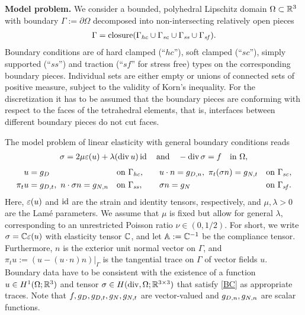\documentclass[11pt]{article}
\begin{document}
{\bf Model problem.}
We consider a bounded, polyhedral Lipschitz domain $\Omega\subset\mathbb{R}^3$
with boundary $\Gamma:=\partial\Omega$ decomposed into non-intersecting relatively open pieces
\begin{align*} %
   \Gamma=\mathrm{closure}(\G{hc}\cup\G{sc}\cup\G{ss}\cup\G{sf}).
\end{align*}
Boundary conditions are of hard clamped (``$\mathit{hc}$''), soft clamped (``$\mathit{sc}$''),
simply supported (``$\mathit{ss}$'') and traction (``$\mathit{sf}$'' for stress free) types
on the corresponding boundary pieces. Individual sets are either empty or unions
of connected sets of positive measure, subject to the validity of Korn's inequality.
For the discretization it has to be assumed that the boundary pieces are conforming
with respect to the faces of the tetrahedral elements, that is, interfaces between
different boundary pieces do not cut faces.

The model problem of linear elasticity with general boundary conditions reads
\begin{align*} %
   \sigma=2\mu\strain{u}+\lambda(\div u)\id
   \quad\text{and}\quad -\div\sigma=f\quad\text{in}\ \Omega,
\end{align*}
\begin{equation} \label{BC}
\begin{alignedat}{4}
   u&={g_{D}} &&\text{on}\ {\Gamma_\mathit{hc}},\qquad
   &&u\cdot n={g_{D,n}},\ \pi_t(\sigma n)={g_{N,t}}\quad &&\text{on}\ {\Gamma_\mathit{sc}},
   \\
   \pi_t u&={g_{D,t}},\ n\cdot\sigma n={g_{N,n}}\quad &&\text{on}\ {\Gamma_\mathit{ss}},
   &&\sigma n={g_{N}} &&\text{on}\ {\Gamma_\mathit{sf}}.
\end{alignedat}
\end{equation}
Here, $\varepsilon(u)$ and $\operatorname{\mathrm{id}}$ are the strain and identity tensors, respectively,
and $\mu,\lambda>0$ are the Lam\'e parameters.
We assume that $\mu$ is fixed but allow for general $\lambda$, corresponding to
an unrestricted Poisson ratio $\nu\in (0,1/2)$.
For short, we write $\sigma=\mathbb{C}\varepsilon(u)$ with elasticity tensor $\mathbb{C}$, and
let $\mathbb{A}:=\mathbb{C}^{-1}$ be the compliance tensor. Furthermore,
$n$ is the exterior unit normal vector on $\Gamma$, and
$\pi_t u:=(u-(u\cdot n)n)|_\Gamma$ is the tangential trace on $\Gamma$ of vector fields $u$.
Boundary data have to be consistent with the existence of a function
$u\in H^1(\Omega;\mathbb{R}^3)$ and tensor $\sigma\in H(\operatorname{div},\Omega;\mathbb{R}^{3\times 3})$
that satisfy \eqref{BC} as appropriate traces.
Note that $f,{g_{D}},{g_{D,t}},{g_{N}},{g_{N,t}}$ are vector-valued and
${g_{D,n}},{g_{N,n}}$ are scalar functions.
\end{document}
